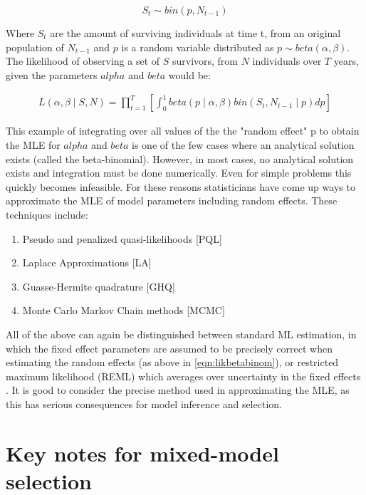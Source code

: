 \documentclass{article}\usepackage[]{graphicx}\usepackage[]{color}
\numberwithin{equation}{section} %
\numberwithin{figure}{section} %
\numberwithin{table}{section} %
\begin{document}
\begin{equation}
S_t \sim bin(p,N_{t-1}) 
\end{equation}

Where $S_t$ are the amount of surviving individuals at time t, from an original population of $N_{t-1}$ and $p$ is a random variable distributed as $p \sim beta(\alpha,\beta)$. The likelihood of observing a set of $S$ survivors, from $N$ individuals over $T$ years, given the parameters $alpha$ and $beta$ would be: 

\begin{equation}
\begin{split}
L(\alpha,\beta \mid S,N) = \prod^{T}_{t=1} \left[ \int^{1}_{0} beta(p \mid \alpha,\beta) bin(S_t,N_{t-1} \mid p) dp \right]  \label{eqn:likbetabinom}
\end{split}
\end{equation}

This example of integrating over all values of the the "random effect" p to obtain the MLE for $alpha$ and $beta$ is one of the few cases where an analytical solution exists (called the beta-binomial). However, in most cases, no analytical solution exists and integration must be done numerically. Even for simple problems this quickly becomes infeasible. For these reasons statisticians have come up ways to approximate the MLE of model parameters including random effects. These techniques include:

\begin{enumerate}
\item Pseudo and penalized quasi-likelihoods [PQL]
\item Laplace Approximations [LA]
\item Guasse-Hermite quadrature [GHQ]
\item Monte Carlo Markov Chain methods [MCMC]
\end{enumerate}

All of the above can again be distinguished between standard ML estimation, in which the fixed effect parameters are assumed to be precisely correct when estimating the random effects (as above in \ref{eqn:likbetabinom}), or restricted maximum likelihood (REML) which averages over uncertainty in the fixed effects \citep{Pinheiro2000}. It is good to consider the precise method used in approximating the MLE, as this has serious consequences for model inference and selection.

\section{Key notes for mixed-model selection}
\end{document}
